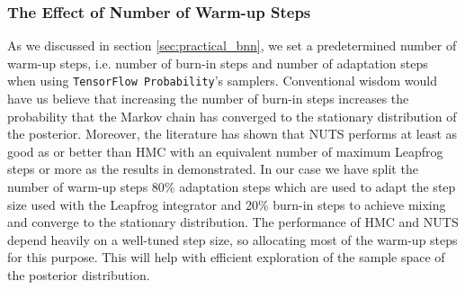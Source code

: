 \subsubsection{The Effect of Number of Warm-up Steps}
As we discussed in section \ref{sec:practical_bnn}, we set a predetermined number of warm-up steps, i.e. number of burn-in steps and number of adaptation steps when using {\tt TensorFlow Probability}'s samplers.
Conventional wisdom would have us believe that increasing the number of burn-in steps increases the probability that the Markov chain has converged
to the stationary distribution of the posterior. Moreover, the literature has shown that NUTS performs at least as good as or better than HMC with an equivalent number of maximum Leapfrog steps or more as the results in \cite{nuts} demonstrated. In our case we have split the number of warm-up steps 80\% adaptation steps which are used to adapt the step size used with the Leapfrog integrator and 20\% burn-in steps to achieve mixing and converge to the stationary distribution. The performance of HMC and NUTS depend heavily on a well-tuned step size, so allocating most of the warm-up steps for this purpose. This will help with efficient exploration of the sample space of the posterior distribution.

